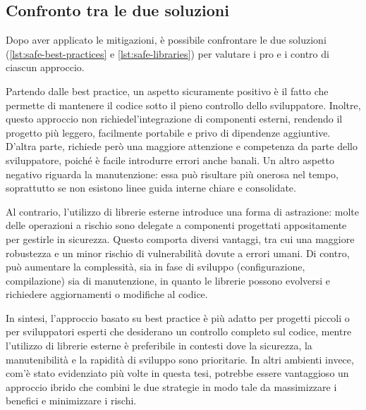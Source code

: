\subsection*{Confronto tra le due soluzioni}
\label{sec:comparison-case-study}

Dopo aver applicato le mitigazioni, è possibile confrontare le due soluzioni (\autoref{lst:safe-best-practices}
e \autoref{lst:safe-libraries}) per valutare i pro e i contro di ciascun
approccio.

Partendo dalle best practice, un aspetto sicuramente positivo è il fatto che permette
di mantenere il codice sotto il pieno controllo dello sviluppatore. Inoltre, questo
approccio non richiedel'integrazione di componenti esterni, rendendo il progetto
più leggero, facilmente portabile e privo di dipendenze aggiuntive. D'altra
parte, richiede però una maggiore attenzione e competenza da parte dello sviluppatore,
poiché è facile introdurre errori anche banali. Un altro aspetto negativo riguarda
la manutenzione: essa può risultare più onerosa nel tempo, soprattutto se non esistono
linee guida interne chiare e consolidate.

Al contrario, l'utilizzo di librerie esterne introduce una forma di astrazione: molte
delle operazioni a rischio sono delegate a componenti progettati appositamente per
gestirle in sicurezza. Questo comporta diversi vantaggi, tra cui una maggiore robustezza
e un minor rischio di vulnerabilità dovute a errori umani. Di contro, può aumentare
la complessità, sia in fase di sviluppo (configurazione, compilazione) sia di manutenzione,
in quanto le librerie possono evolversi e richiedere aggiornamenti o modifiche
al codice.

In sintesi, l'approccio basato su best practice è più adatto per progetti piccoli
o per sviluppatori esperti che desiderano un controllo completo sul codice,
mentre l'utilizzo di librerie esterne è preferibile in contesti dove la
sicurezza, la manutenibilità e la rapidità di sviluppo sono prioritarie. In
altri ambienti invece, com'è stato evidenziato più volte in questa tesi,
potrebbe essere vantaggioso un approccio ibrido che combini le due strategie in
modo tale da massimizzare i benefici e minimizzare i rischi.